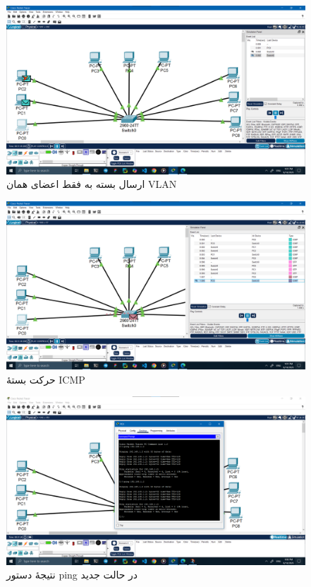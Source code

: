 \documentclass[12pt]{article}
\begin{document}
	\begin{figure}[H]
		\centering
		\includegraphics[width=\textwidth]{resources/9.png}
		\caption{ارسال بسته به فقط اعضای همان \textenglish{VLAN}}
		\label{img:9}
	\end{figure}
	\begin{figure}[H]
		\centering
		\includegraphics[width=\textwidth]{resources/10.png}
		\caption{حرکت بستهٔ \textenglish{ICMP}}
		\label{img:10}
	\end{figure}
	\begin{figure}[H]
		\centering
		\includegraphics[width=\textwidth]{resources/11.png}
		\caption{نتیجهٔ دستور \textenglish{ping} در حالت جدید}
		\label{img:11}
	\end{figure}
	
\end{document}
